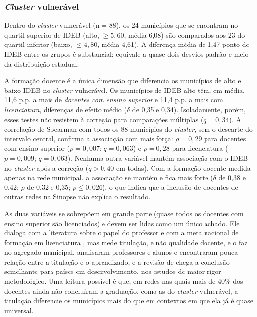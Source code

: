 \subsubsection{\textit{Cluster} vulnerável}

Dentro do \textit{cluster} vulnerável (n = 88), os 24 municípios que se encontram no quartil superior de IDEB (alto, $\geq 5{,}60$, média 6,08) são comparados aos 23 do quartil inferior (baixo, $\leq 4{,}80$, média 4,61). A diferença média de 1,47 ponto de IDEB entre os grupos é substancial: equivale a quase dois desvios-padrão e meio da distribuição estadual.

A formação docente é a única dimensão que diferencia os municípios de alto e baixo IDEB no \textit{cluster} vulnerável. Os municípios de IDEB alto têm, em média, 11,6 p.p. a mais de \textit{docentes com ensino superior} e 11,4 p.p. a mais com \textit{licenciatura}, diferenças de efeito médio ($\delta$ de 0,35 e 0,34). Isoladamente, porém, esses testes não resistem à correção para comparações múltiplas ($q = 0{,}34$). A correlação de Spearman com todos os 88 municípios do \textit{cluster}, sem o descarte do intervalo central, confirma a associação com mais força: $\rho = 0{,}29$ para docentes com ensino superior ($p = 0{,}007$; $q = 0{,}063$) e $\rho = 0{,}28$ para licenciatura ($p = 0{,}009$; $q = 0{,}063$). Nenhuma outra variável mantém associação com o IDEB no \textit{cluster} após a correção ($q > 0{,}40$ em todas). Com a formação docente medida apenas na rede municipal, a associação se mantém e fica mais forte ($\delta$ de 0,38 e 0,42; $\rho$ de 0,32 e 0,35; $p \leq 0{,}026$), o que indica que a inclusão de docentes de outras redes na Sinopse não explica o resultado.

As duas variáveis se sobrepõem em grande parte (quase todos os docentes com ensino superior são licenciados) e devem ser lidas como um único achado. Ele dialoga com a literatura sobre o papel do professor \citep{rivkin2005} e com a meta nacional de formação em licenciatura \citep{brasil2014}, mas mede titulação, e não qualidade docente, e o faz no agregado municipal. \citet{rivkin2005} analisaram professores e alunos e encontraram pouca relação entre a titulação e o aprendizado, e a revisão de \citet{glewwe2013} chega a conclusão semelhante para países em desenvolvimento, nos estudos de maior rigor metodológico. Uma leitura possível é que, em redes nas quais mais de 40\% dos docentes ainda não concluíram a graduação, como as do \textit{cluster} vulnerável, a titulação diferencie os municípios mais do que em contextos em que ela já é quase universal.

